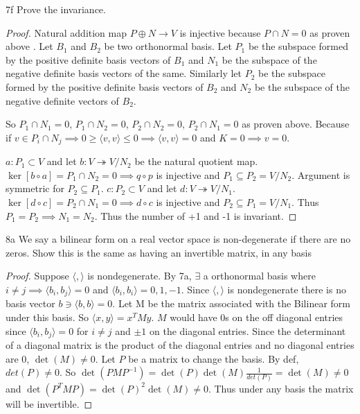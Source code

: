 \documentclass{article}
\newcommand{\angles}[1]{\langle #1 \rangle}
\begin{document}
\begin{claim}{7f}\label{Claim 7f.}
    Prove the invariance. 
\end{claim}
\begin{proof}
    Natural addition map $P \oplus N \to V$ is injective because $P \cap N = 0$ as proven above . Let $B_1$ and $B_2$ be two orthonormal basis. Let $P_1$ be the subspace formed by the positive definite basis vectors of $B_1$ and $N_1$ be the subspace of the negative definite basis vectors of the same. Similarly let $P_2$ be the subspace formed by the positive definite basis vectors of $B_2$ and $N_2$ be the subspace of the negative definite vectors of $B_2$. 
    
    So $P_1 \cap N_1 = 0$, $P_1 \cap N_2 = 0$, $P_2 \cap N_2 = 0$, $P_2 \cap N_1 = 0$ as proven above. Because if $v \in P_i \cap N_j \implies 0 \geq \angles{v, v} \leq 0 \implies \angles{v, v} = 0$ and $K = 0 \implies v = 0$. 
    
    $a: P_1 \subset V$ and let $b: V \twoheadrightarrow V / N_2$ be the natural quotient map. $\ker[b \circ a] = P_1 \cap N_2 = 0 \implies q \circ p$ is injective and $P_1 \subseteq P_2 = V / N_2$. Argument is symmetric for $P_2 \subseteq P_1$. $c: P_2 \subset V$ and let $d: V \twoheadrightarrow V / N_1$. $\ker[d \circ c] = P_2 \cap N_1 = 0 \implies d \circ c$ is injective and $P_2 \subseteq P_1 = V / N_1$. Thus $P_1 = P_2 \implies N_1 = N_2$. Thus the number of +1 and -1 is invariant.      
\end{proof}

\bigskip

\begin{PROB}{8a}\label{Problem 8a.}
    We say a bilinear form on a real vector space is non-degenerate if there are no zeros. Show this is the same as having an invertible matrix, in any basis 
\end{PROB}
\begin{proof}
    Suppose $\angles{ , }$ is nondegenerate. By 7a, $\exists$ a orthonormal basis where $i \neq j \implies \angles{b_i, b_j} = 0$ and $\angles{b_i, b_i} = 0, 1, -1$. Since $\angles{ , }$ is nondegenerate there is no basis vector $b \ni \angles{b ,b} = 0$. Let M be the matrix associated with the Bilinear form under this basis. So $\angles{x, y} = x^T M y$. $M$ would have 0s on the off diagonal entries since $\angles{b_i, b_j} = 0$ for $i \neq j$ and $\pm 1$ on the diagonal entries. Since the determinant of a diagonal matrix is the product of the diagonal entries and no diagonal entries are 0, $\det(M) \neq 0$. Let $P$ be a matrix to change the basis. By def, $det(P) \neq 0$. So $\det(PMP^{-1}) = \det(P)\det(M)\frac{1}{det(P)} = \det(M) \neq 0$ and $\det(P^T M P) = \det(P)^2 \det(M) \neq 0$. Thus under any basis the matrix will be invertible.                  
\end{proof}
\end{document}

